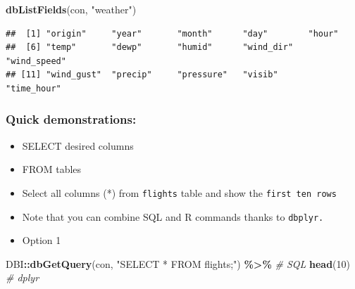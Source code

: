 \documentclass[
]{book}
\newenvironment{Shaded}{\begin{snugshade}}{\end{snugshade}}
\newcommand{\CommentTok}[1]{\textcolor[rgb]{0.56,0.35,0.01}{\textit{#1}}}
\newcommand{\DecValTok}[1]{\textcolor[rgb]{0.00,0.00,0.81}{#1}}
\newcommand{\FunctionTok}[1]{\textcolor[rgb]{0.13,0.29,0.53}{\textbf{#1}}}
\newcommand{\NormalTok}[1]{#1}
\newcommand{\SpecialCharTok}[1]{\textcolor[rgb]{0.81,0.36,0.00}{\textbf{#1}}}
\newcommand{\StringTok}[1]{\textcolor[rgb]{0.31,0.60,0.02}{#1}}
\begin{document}
\begin{Shaded}
\begin{Highlighting}[]
\FunctionTok{dbListFields}\NormalTok{(con, }\StringTok{"weather"}\NormalTok{)}
\end{Highlighting}
\end{Shaded}

\begin{verbatim}
##  [1] "origin"     "year"       "month"      "day"        "hour"      
##  [6] "temp"       "dewp"       "humid"      "wind_dir"   "wind_speed"
## [11] "wind_gust"  "precip"     "pressure"   "visib"      "time_hour"
\end{verbatim}

\subsubsection{Quick demonstrations:}\label{quick-demonstrations}

\begin{itemize}
\item
  SELECT desired columns
\item
  FROM tables
\item
  Select all columns (*) from \texttt{flights} table and show the \texttt{first\ ten\ rows}
\item
  Note that you can combine SQL and R commands thanks to \texttt{dbplyr.}
\item
  Option 1
\end{itemize}

\begin{Shaded}
\begin{Highlighting}[]
\NormalTok{DBI}\SpecialCharTok{::}\FunctionTok{dbGetQuery}\NormalTok{(con, }
                \StringTok{"SELECT * FROM flights;"}\NormalTok{) }\SpecialCharTok{\%\textgreater{}\%} \CommentTok{\# SQL}
  \FunctionTok{head}\NormalTok{(}\DecValTok{10}\NormalTok{) }\CommentTok{\# dplyr }
\end{Highlighting}
\end{Shaded}
\end{document}
